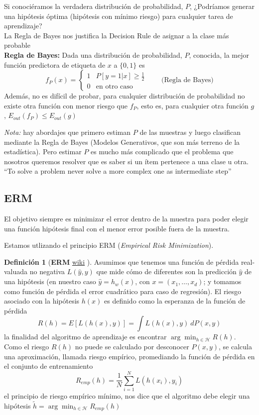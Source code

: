 \documentclass[11pt,a4paper]{article}
\theoremstyle{definition}
\newtheorem{definition}{Definición}[section]
\begin{document}
	Si conociéramos la verdadera distribución de probabilidad, $P$, ¿Podríamos generar una hipótesis óptima (hipótesis con mínimo riesgo) para cualquier tarea de aprendizaje? \\
	La Regla de Bayes nos justifica la Decision Rule de asignar a la clase más probable\\
	\textbf{Regla de Bayes:}
	Dada una distribución de probabilidad, $P$, conocida, la mejor función predictora de etiqueta de $x$ a $\{0,1\}$ es
	$$f_P(x)=\begin{cases} 1 & P[y=1|x]\geq \frac{1}{2} \\
	0 & \text{en otro caso} \end{cases}\quad \quad \text{(Regla de Bayes)}$$
	Además, no es difícil de probar, para cualquier distribución de probabilidad no existe otra función con menor riesgo que $f_P$, esto es, para cualquier otra función $g$, $E_{out}(f_P)\leq E_{out}(g)$
	
	\textit{Nota:} hay abordajes que primero estiman $P$ de las muestras y luego clasifican mediante la Regla de Bayes (Modelos Generativos, que son más terreno de la estadística). Pero estimar $P$ es mucho más complicado que el problema que nosotros queremos resolver que es saber si un ítem pertenece a una clase u otra. ``To solve a problem never solve a more complex one as intermediate step''
	
	
	\subsection{ERM}
	El objetivo siempre es minimizar el error dentro de la muestra para poder elegir una función hipótesis final con el menor error posible fuera de la muestra.
	
	Estamos utlizando el principio ERM (\textit{Empirical Risk Minimization}).
	
	\begin{definition}[\textbf{ERM} \href{https://en.wikipedia.org/wiki/Empirical_risk_minimization}{wiki} ] 
	Asumimos que tenemos una función de pérdida real-valuada no negativa $L(\hat y, y)$ que mide cómo de diferentes son la predicción $\hat y$ de una hipótesis (en nuestro caso $\hat y=h_w(x)$, con $x=(x_1,\ldots , x_d)$; y tomamos como función de pérdida el error cuadrático para caso de regresión). El riesgo asociado con la hipótesis $h(x)$ es definido como la esperanza de la función de pérdida
	$$R(h)=E[L(h(x),y)]=\int L(h(x),y) \ dP(x,y)$$
	la finalidad del algoritmo de aprendizaje es encontrar $\arg \min_{h\in \mathcal{H}} R(h)$. Como el riesgo $R(h)$ no puede se calculado por desconocer $P(x,y)$, se calcula una aproximación, llamada riesgo empírico, promediando la función de pérdida en el conjunto de entrenamiento
	$$R_{emp} (h) = \frac{1}{N} \sum_{i=1}^N L(h(x_i),y_i)$$
	el principio de riesgo empírico mínimo, nos dice que el algoritmo debe elegir una hipótesis $\tilde h = \arg \min_{h\in \mathcal{H}} R_{emp}(h)$
	\end{definition}
	
\end{document}
